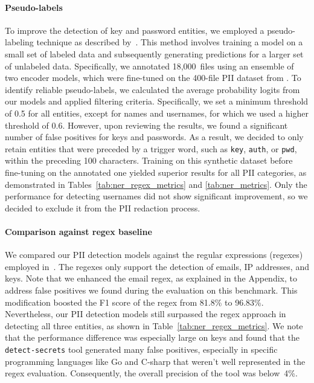 \documentclass[10pt]{article} %
\begin{document}

\paragraph{Pseudo-labels} To improve the detection of key and password entities, we employed a pseudo-labeling technique as described by~\citet{lee2013pseudo}. This method involves training a model on a small set of labeled data and subsequently generating predictions for a larger set of unlabeled data. Specifically, we annotated 18,000~files using an ensemble of two encoder models, which were fine-tuned on the 400-file PII dataset from \citet{allal2023santacoder}.
To identify reliable pseudo-labels, we calculated the average probability logits from our models and applied filtering criteria. Specifically, we set a minimum threshold of 0.5 for all entities, except for names and usernames, for which we used a higher threshold of 0.6. However, upon reviewing the results, we found a significant number of false positives for keys and passwords. As a result, we decided to only retain entities that were preceded by a trigger word, such as \texttt{key}, \texttt{auth}, or \texttt{pwd}, within the preceding 100 characters. Training on this synthetic dataset before fine-tuning on the annotated one yielded superior results for all PII categories, as demonstrated in Tables~\ref{tab:ner_regex_metrics} and \ref{tab:ner_metrics}. Only the performance for detecting usernames did not show significant improvement, so we decided to exclude it from the PII redaction process. 

\paragraph{Comparison against regex baseline} We compared our PII detection models against the regular expressions (regexes) employed in~\citet{allal2023santacoder}. The regexes only support the detection of emails, IP addresses, and keys. Note that we enhanced the email regex, as explained in the Appendix, to address false positives we found during the evaluation on this benchmark. This modification boosted the F1 score of the regex from 81.8\% to 96.83\%. Nevertheless, our PII detection models still surpassed the regex approach in detecting all three entities, as shown in Table~\ref{tab:ner_regex_metrics}. We note that the performance difference was especially large on keys and found that the \texttt{detect-secrets} tool generated many false positives, especially in specific programming languages like Go and C-sharp that weren't well represented in the regex evaluation. Consequently, the overall precision of the tool was below~4\%.
\end{document}
